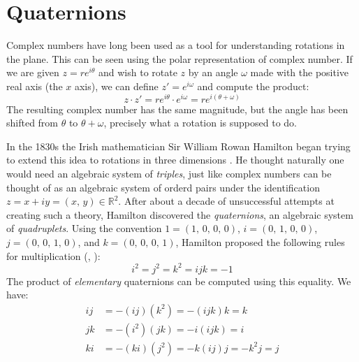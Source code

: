 \documentclass{article}
\theoremstyle{plain}
\theoremstyle{normal}
\begin{document}
    \section{Quaternions}
        Complex numbers have long been used as a tool for understanding
        rotations in the plane. This can be seen using the polar
        representation of complex number. If we are given $z=re^{i\theta}$ and
        wish to rotate $z$ by an angle $\omega$ made with the positive real
        axis (the $x$ axis), we can define
        $z'=e^{i\omega}$ and compute the product:
        \begin{equation}
            \label{eqn:complex_numbers_as_rotations}
            z\cdot{z}'=re^{i\theta}\cdot{e}^{i\omega}=re^{i(\theta+\omega)}
        \end{equation}
        The resulting complex number has the same magnitude, but the angle
        has been shifted from $\theta$ to $\theta+\omega$, precisely what a
        rotation is supposed to do.
        \par\hfill\par
        In the 1830s the Irish mathematician Sir William Rowan Hamilton began
        trying to extend this idea to rotations in three dimensions
        \cite[p.~2]{BuchmannQuaternionHistory}. He thought naturally one would
        need an algebraic system of \textit{triples}, just like complex numbers
        can be thought of as an algebraic system of orderd pairs under the
        identification $z=x+iy=(x,\,y)\in\mathbb{R}^{2}$.
        After about a decade of unsuccessful attempts at creating such a
        theory, Hamilton discovered the \textit{quaternions}, an algebraic
        system of \textit{quadruplets}. Using the convention
        $1=(1,\,0,\,0,\,0)$, $i=(0,\,1,\,0,\,0)$, $j=(0,\,0,\,1,\,0)$, and
        $k=(0,\,0,\,0,\,1)$, Hamilton proposed the following rules for
        multiplication (\cite[p.~158]{HamiltonElementsOfQuaternions},
        \cite[p.~1]{HamiltonOnQuaternions}):
        \begin{equation}
            i^{2}=j^{2}=k^{2}=ijk=-1
        \end{equation}
        The product of \textit{elementary} quaternions can be computed using
        this equality. We have:
        \begin{align}
            ij&=-(ij)(k^2)=-(ijk)k=k\\
            jk&=-(i^2)(jk)=-i(ijk)=i\\
            ki&=-(ki)(j^{2})=-k(ij)j=-k^{2}j=j
        \end{align}
\end{document}
